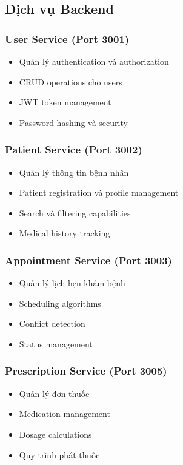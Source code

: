 \documentclass[12pt,a4paper]{report}
\begin{document}
\subsection{Dịch vụ Backend}
\subsubsection{User Service (Port 3001)}
\begin{itemize}
    \item Quản lý authentication và authorization
    \item CRUD operations cho users
    \item JWT token management
    \item Password hashing và security
\end{itemize}

\subsubsection{Patient Service (Port 3002)}
\begin{itemize}
    \item Quản lý thông tin bệnh nhân
    \item Patient registration và profile management
    \item Search và filtering capabilities
    \item Medical history tracking
\end{itemize}

\subsubsection{Appointment Service (Port 3003)}
\begin{itemize}
    \item Quản lý lịch hẹn khám bệnh
    \item Scheduling algorithms
    \item Conflict detection
    \item Status management
\end{itemize}

\subsubsection{Prescription Service (Port 3005)}
\begin{itemize}
    \item Quản lý đơn thuốc
    \item Medication management
    \item Dosage calculations
    \item Quy trình phát thuốc
\end{itemize}
\end{document}
